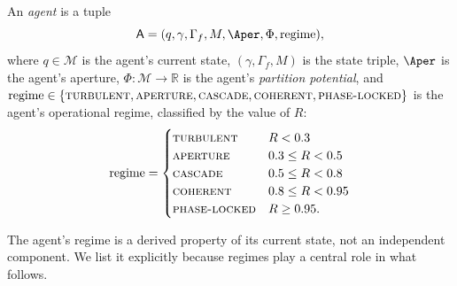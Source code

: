 \documentclass[11pt,twocolumn,a4paper]{article}
\newcommand{\R}{\mathbb{R}}
\newcommand{\agent}{\mathsf{A}}
\begin{document}
\begin{definition}[Agent]\label{def:agent}
An \emph{agent} is a tuple
\[
\agent = (q, \gamma, \Gamma_f, M, \Aper, \Phi, \mathrm{regime}),
\]
where $q \in \mathcal{M}$ is the agent's current state, $(\gamma, \Gamma_f, M)$ is the
state triple, $\Aper$ is the agent's aperture, $\Phi: \mathcal{M} \to \R$ is the agent's
\emph{partition potential}, and $\mathrm{regime} \in \{\textsc{turbulent},
\textsc{aperture}, \textsc{cascade}, \textsc{coherent}, \textsc{phase-locked}\}$ is
the agent's operational regime, classified by the value of $R$:
\begin{align*}
\mathrm{regime} = \begin{cases}
\textsc{turbulent} & R < 0.3\\
\textsc{aperture} & 0.3 \le R < 0.5\\
\textsc{cascade} & 0.5 \le R < 0.8\\
\textsc{coherent} & 0.8 \le R < 0.95\\
\textsc{phase-locked} & R \ge 0.95.
\end{cases}
\end{align*}
\end{definition}

The agent's regime is a derived property of its current state, not an independent
component. We list it explicitly because regimes play a central role in what follows.
\end{document}
